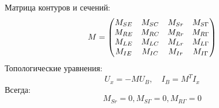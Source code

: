 	Матрица контуров и сечений:
	\begin{equation}
		M = \begin{pmatrix}
			M_{SE} & M_{SC} & M_{Sr} & M_{S\Gamma} \\
			M_{RE} & M_{RC} & M_{Rr} & M_{R\Gamma} \\
			M_{LE} & M_{LC} & M_{Lr} & M_{L\Gamma} \\
			M_{IE} & M_{IC} & M_{Ir} & M_{I\Gamma}
		\end{pmatrix}
		\vspace{-0.5em}
	\end{equation}
	Топологические уравнения:
	\begin{equation}
		U_x = -M U_B, \quad I_B = M^T I _x
	\end{equation}
	Всегда:
	\begin{equation}
		M_{Sr} = 0, M_{S\Gamma} = 0, M_{R\Gamma} = 0
	\end{equation}
	\vspace{-2.5em}
